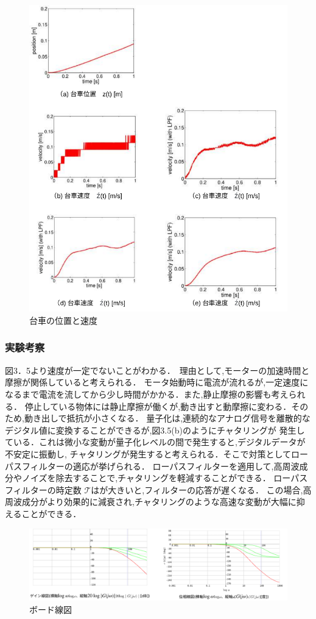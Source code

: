 \begin{figure}[h]
  \centering
  \includegraphics[scale=1]{sozai/3.pdf}
  \caption{台車の位置と速度}
\end{figure}


\subsubsection{実験考察}
図3．5より速度が一定でないことがわかる．　理由として,モーターの加速時間と摩擦が関係していると考えられる．
モータ始動時に電流が流れるが,一定速度になるまで電流を流してから少し時間がかかる．また,静止摩擦の影響も考えられる．
停止している物体には静止摩擦が働くが,動き出すと動摩擦に変わる．そのため,動き出しで抵抗が小さくなる．
量子化は,連続的なアナログ信号を離散的なデジタル値に変換することができるが,図3.5(b)のようにチャタリングが
発生している．これは微小な変動が量子化レベルの間で発生すると,デジタルデータが不安定に振動し,
チャタリングが発生すると考えられる．そこで対策としてローパスフィルターの適応が挙げられる．
ローパスフィルターを適用して,高周波成分やノイズを除去することで,チャタリングを軽減することができる．
ローパスフィルターの時定数 \(\mathcal{T}\)はが大きいと,フィルターの応答が遅くなる．
この場合,高周波成分がより効果的に減衰され,チャタリングのような高速な変動が大幅に抑えることができる．


\begin{figure}[h]
  \centering
  \includegraphics[scale=0.65]{sozai/4.pdf}
  \caption{ボード線図}
\end{figure}
